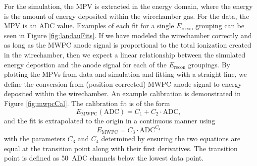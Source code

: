 For the simulation, the MPV is extracted in the energy domain, where the energy is the
amount of energy deposited within the wirechamber gas. For the data, the MPV is an ADC value.
Examples of each fit for a single $E_{\mathrm{recon}}$ grouping can be seen in Figure \ref{fig:landauFits}.
If we
have modeled the wirechamber correctly and as long as the MWPC anode signal is proportional to
the total ionization created in the wirechamber, then we expect a linear relationship between the
simulated energy depostion and the anode signal for each of the $E_{\mathrm{recon}}$ groupings. By plotting
the MPVs from data and simulation and fitting with a straight line, we define the conversion
from (position corrected) MWPC anode signal to energy deposited within the wirechamber. An example
calibration is demonstrated in Figure \ref{fig:mwpcCal}. The calibration fit is of the form
%
\begin{equation} \label{eq:pureLin}
  E_{\mathrm{MWPC}}(\mathrm{ADC}) = C_1 + C_2\cdot \mathrm{ADC},
\end{equation}
and the fit is extrapolated to the origin in a continuous manner using
\begin{equation}
  E_{\mathrm{MWPC}} = C_3 \cdot \mathrm{ADC}^{C_4}
\end{equation}
with the parameters $C_3$ and $C_4$ determined by ensuring the two equations are equal at the
transition point along with their first derivatives. The transition point is defined as 50~ADC channels
below the lowest data point.

